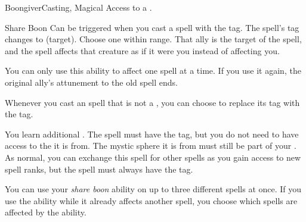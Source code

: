     \begin{magicalfeat}{Boongiver}{Casting, Magical}
        \featpre Access to a .

        \begin{magicalactiveability}{Share Boon}
            \abilityusagetime Can be triggered when you cast a spell with the  tag.
            \rankline
            The spell's  tag changes to  (target).
            Choose one  within \rngmed range.
            That ally is the target of the spell, and the spell affects that creature as if it were you instead of affecting you.

            You can only use this ability to affect one spell at a time.
            If you use it again, the original ally's attunement to the old spell ends.
        \end{magicalactiveability}

         Whenever you cast an  spell that is not a , you can choose to replace its  tag with the  tag.

         You learn additional .
        The spell must have the  tag, but you do not need to have access to the  it is from.
        The mystic sphere it is from must still be part of your .
        As normal, you can exchange this spell for other spells as you gain access to new spell ranks, but the spell must always have the  tag.

         You can use your \textit{share boon} ability on up to three different spells at once.
        If you use the ability while it already affects another spell, you choose which spells are affected by the ability.
    \end{magicalfeat}

